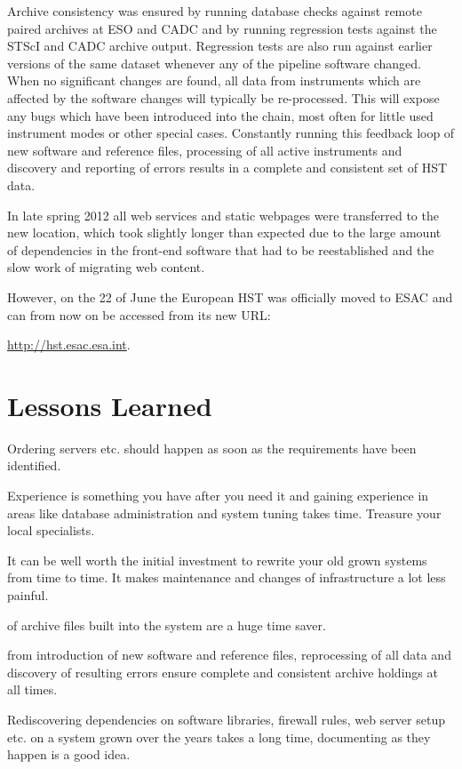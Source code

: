 \documentclass[11pt,twoside]{article}  %
\begin{document}
Archive consistency was  ensured by running 
database checks against remote paired archives at ESO and CADC 
and by running regression tests against the STScI and CADC archive output.
Regression tests are also run against earlier versions of the same dataset whenever any of the pipeline software changed. When no significant changes are found, all data from instruments which are affected by the software changes will typically be re-processed. This will expose any bugs which have been introduced into the chain, most often for little used instrument modes or other special cases.
Constantly  running this feedback loop of new software and reference files, processing of all active instruments and discovery and reporting of errors 
results in a complete and consistent set of HST data. 

In late spring 2012 all web services and static webpages were transferred to the new location, which took slightly longer than expected due to the large amount of dependencies in the front-end software that had to be reestablished and the slow work of migrating web content.

However, on the 22 of June the European HST was officially moved to ESAC and can from now on be accessed from its new URL: 

 \url{http://hst.esac.esa.int}.

\section{Lessons Learned}

\begin{description} \itemsep0pt 
\item[ Hardware procurement takes time.] Ordering servers etc. should happen as soon as the requirements have been identified.
\item[ Make sure the right skill set is at hand.] Experience is something you have after you need it and gaining experience in areas like database administration and system tuning takes time. Treasure your local specialists.
\item[ Flexible, lightweight and comprehensive archive software is a lifesaver] It can be well worth the initial investment to rewrite your old grown systems from time to time. It makes maintenance and changes of infrastructure a lot less painful.
\item[Automated synchronisation and re-ingestion ] of archive files built into the system are a huge time saver. 
\item[A closed loop] from introduction of new software and reference files, reprocessing of all data and discovery of resulting errors ensure complete and consistent archive holdings at all times.
\item[Document dependencies!] Rediscovering dependencies on software libraries, firewall rules, web server setup etc. on a system grown over the years takes a long time, documenting as they happen is a good idea. 
\end{description}




\end{document}

